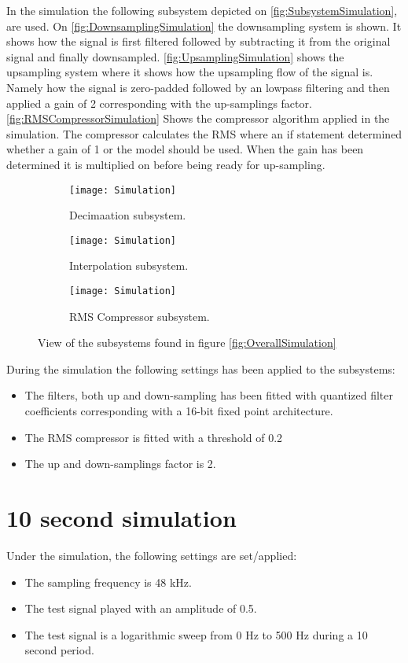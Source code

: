 In the simulation the following subsystem depicted on \autoref{fig:SubsystemSimulation}, are used. On \autoref{fig:DownsamplingSimulation} the downsampling system is shown. It shows how the signal is first filtered followed by subtracting it from the original signal and finally downsampled. \autoref{fig:UpsamplingSimulation} shows the upsampling system where it shows how the upsampling flow of the signal is. Namely how the signal is zero-padded followed by an lowpass filtering and then applied a gain of 2 corresponding with the up-samplings factor. \autoref{fig:RMSCompressorSimulation} Shows the compressor algorithm applied in the simulation. The compressor calculates the RMS where an if statement determined whether a gain of 1 or the model should be used. When the gain has been determined it is multiplied on before being ready for up-sampling. 
\begin{figure}[H]
\centering
\begin{subfigure}[t]{0.49\textwidth}
    \centering
\texttt{[image: Simulation]}
    \caption{Decimaation subsystem.}
    \label{fig:DownsamplingSimulation}
\end{subfigure}
\begin{subfigure}[t]{0.49\textwidth}
    \centering
\texttt{[image: Simulation]}
    \caption{Interpolation subsystem.}
    \label{fig:UpsamplingSimulation}
\end{subfigure}
\begin{subfigure}[t]{\textwidth}
    \centering
\texttt{[image: Simulation]}
    \caption{RMS Compressor subsystem.}
    \label{fig:RMSCompressorSimulation}
\end{subfigure}
\label{fig:SubsystemSimulation}
\caption{View of the subsystems found in figure \ref{fig:OverallSimulation}}
\end{figure}


During the simulation the following settings has been applied to the subsystems:
\begin{itemize}
\item The filters, both up and down-sampling has been fitted with quantized filter coefficients corresponding with a 16-bit fixed point architecture.
\item The RMS compressor is fitted with a threshold of 0.2 
\item The up and down-samplings factor is 2.
\end{itemize}

\section{10 second simulation}
Under the simulation, the following settings are set/applied:
\begin{itemize}
\item The sampling frequency is 48 kHz.
\item The test signal played with an amplitude of 0.5.
\item The test signal is a logarithmic sweep from 0 Hz to 500 Hz during a 10 second period.
\end{itemize}

